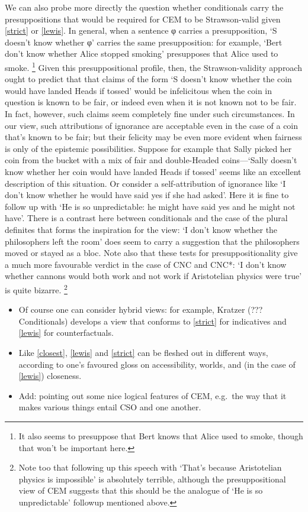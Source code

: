\documentclass[leqno, 11pt, a5paper, openany]{article}
\begin{document}
We can also probe more directly the question whether conditionals carry the presuppositions that would be required for CEM to be Strawson-valid given \ref{strict} or \ref{lewis}.  In general, when a sentence φ carries a presupposition, ‘S doesn't know whether φ’ carries the same presupposition: for example, ‘Bert don't know whether Alice stopped smoking’ presupposes that Alice used to smoke.%
\footnote{It also seems to presuppose that Bert knows that Alice used to smoke, though that won't be important here.}
Given this presuppositional profile, then, the Strawson-validity approach ought to predict that that claims of the form ‘S doesn't know whether the coin would have landed Heads if tossed’ would be infelicitous when the coin in question is known to be fair, or indeed even when it is not known not to be fair.  In fact, however, such claims seem completely fine under such circumstances.  In our view, such attributions of ignorance are acceptable even in the case of a coin that's known to be fair; but their felicity may be even more evident when fairness is only of the epistemic possibilities.   Suppose for example that Sally picked her coin from the bucket with a mix of fair and double-Headed coins---‘Sally doesn't know whether her coin would have landed Heads if tossed’ seems like an excellent description of this situation.  Or consider a self-attribution of ignorance like ‘I don't know whether he would have said yes if she had asked’.  Here it is fine to follow up with ‘He is so unpredictable: he might have said yes and he might not have’.  There is a contrast here between conditionals and the case of the plural definites that forms the inspiration for the view: ‘I don't know whether the philosophers left the room’ does seem to carry a suggestion that the philosophers moved or stayed as a bloc.  Note also that these tests for presuppositionality give a much more favourable verdict in the case of CNC and CNC*: ‘I don't know whether cannons would both work and not work if Aristotelian physics were true’ is quite bizarre.%
\footnote{Note too that following up this speech with ‘That's because Aristotelian physics is impossible’ is absolutely terrible, although the presuppositional view of CEM suggests that this should be the analogue of ‘He is so unpredictable’ followup mentioned above.}


\begin{itemize}
	\item
	Of course one can consider hybrid views: for example, Kratzer (???Conditionals) develops a view that conforms to \ref{strict} for indicatives and \ref{lewis} for counterfactuals.
	\item
	Like \ref{closest}, \ref{lewis} and \ref{strict} can be fleshed out in different ways,
	according to one's favoured gloss on accessibility, worlds, and (in
	the case of \ref{lewis}) closeness.
	\item
	Add: pointing out some nice logical features of CEM, e.g.~the way that
	it makes various things entail CSO and one another.
\end{itemize}
\end{document}
